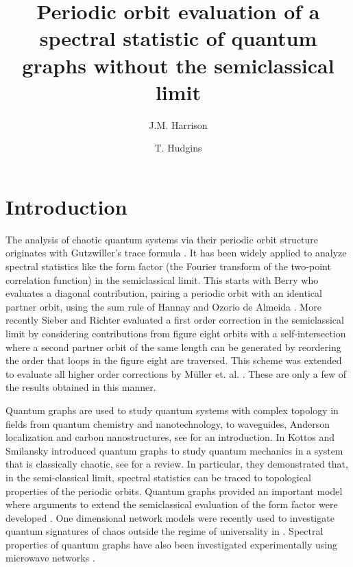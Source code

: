 \documentclass[doublecol]{epl2}
\title{Periodic orbit evaluation of a spectral statistic of quantum graphs without the semiclassical limit}
\author{J.M. Harrison\inst{1} \and T. Hudgins\inst{2}}
\institute{                    
  \inst{1} Baylor University - Department of Mathematics,
  1410 S. 4th Street, Waco, TX 76706, USA\\
  \inst{2} University of Dallas - Department of Mathematics,
  1845 E. Northgate Dr., Irving, TX 75062, USA
}
\begin{document}
\maketitle



\section{Introduction}

The analysis of chaotic quantum systems via their periodic orbit structure originates with Gutzwiller's trace formula \cite{Gutzwiller}.  It has been widely applied to analyze spectral statistics like the form factor (the Fourier transform of the two-point correlation function) in the semiclassical limit.   This starts with Berry \cite{B85} who evaluates a diagonal contribution, pairing a periodic orbit with an identical partner orbit, using the sum rule of Hannay and Ozorio de Almeida \cite{HA84}.  More recently Sieber and Richter \cite{S02,SR01} evaluated a first order correction in the semiclassical limit by considering contributions from figure eight orbits with a self-intersection where a second partner orbit of the same length can be generated by reordering the order that loops in the figure eight are traversed.  This scheme was extended to evaluate all higher order corrections by M\"uller et. al. \cite{Metal04,Metal05}.  These are only a few of the results obtained in this manner.

Quantum graphs are used to study quantum systems with complex topology  in fields from quantum chemistry and nanotechnology, to waveguides, Anderson localization and carbon nanostructures, see \cite{BerkolaikoKuchment} for an introduction.  In \cite{KS97,KS99} Kottos and Smilansky introduced quantum graphs to study quantum mechanics in a system that is classically chaotic, see \cite{GS06} for a review.  In particular, they demonstrated that, in the semi-classical limit, spectral statistics can be traced to topological properties of the periodic orbits.   Quantum graphs provided an important model where arguments to extend the semiclassical evaluation of the form factor were developed \cite{BSW02,BSW03}.
One dimensional network models were recently used to investigate quantum signatures of chaos outside the regime of universality in \cite{Fetal20}.
%
Spectral properties of quantum graphs have also been investigated experimentally using microwave networks \cite{Hetal04,JMS14,Retal16}.  
\end{document}
